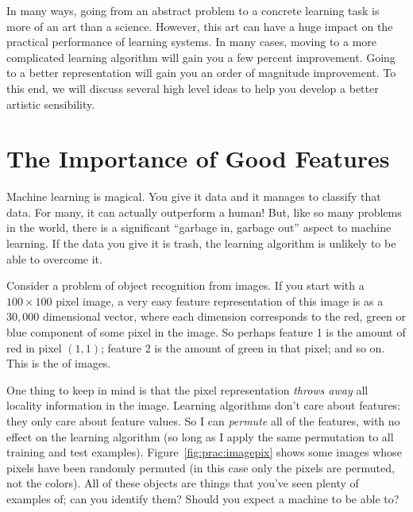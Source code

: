In many ways, going from an abstract problem to a concrete learning
task is more of an art than a science.  However, this art can have a
huge impact on the practical performance of learning systems.  In many
cases, moving to a more complicated learning algorithm will gain you a
few percent improvement.  Going to a better representation will gain
you an order of magnitude improvement.  To this end, we will discuss
several high level ideas to help you develop a better artistic
sensibility.

\section{The Importance of Good Features}

Machine learning is magical.  You give it data and it manages to
classify that data.  For many, it can actually outperform a human!
But, like so many problems in the world, there is a significant
``garbage in, garbage out'' aspect to machine learning.  If the data
you give it is trash, the learning algorithm is unlikely to be able to
overcome it.

Consider a problem of object recognition from images.  If you start
with a $100 \times 100$ pixel image, a very easy feature
representation of this image is as a $30,000$ dimensional vector,
where each dimension corresponds to the red, green or blue component
of some pixel in the image.  So perhaps feature 1 is the amount of red
in pixel $(1,1)$; feature 2 is the amount of green in that pixel; and
so on.  This is the  of images.


One thing to keep in mind is that the pixel representation
\emph{throws away} all locality information in the image.  Learning
algorithms don't care about features: they only care about feature
values.  So I can \emph{permute} all of the features, with no effect
on the learning algorithm (so long as I apply the same permutation to
all training and test examples).  Figure~\ref{fig:prac:imagepix} shows
some images whose pixels have been randomly permuted (in this case only
the pixels are permuted, not the colors).  All of these objects are
things that you've seen plenty of examples of; can you identify them?
Should you expect a machine to be able to?


